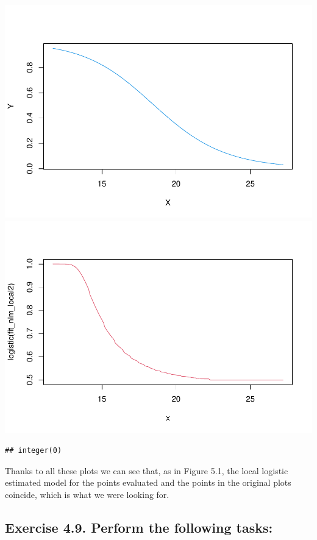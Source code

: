 \documentclass[
]{article}
\begin{document}
\includegraphics{Problemsetrmd_files/figure-latex/unnamed-chunk-8-1.pdf}
\includegraphics{Problemsetrmd_files/figure-latex/unnamed-chunk-8-2.pdf}

\begin{verbatim}
## integer(0)
\end{verbatim}

Thanks to all these plots we can see that, as in Figure 5.1, the local
logistic estimated model for the points evaluated and the points in the
original plots coincide, which is what we were looking for.

\hypertarget{exercise-4.9.-perform-the-following-tasks}{%
\subsection{Exercise 4.9. Perform the following
tasks:}\label{exercise-4.9.-perform-the-following-tasks}}
\end{document}
